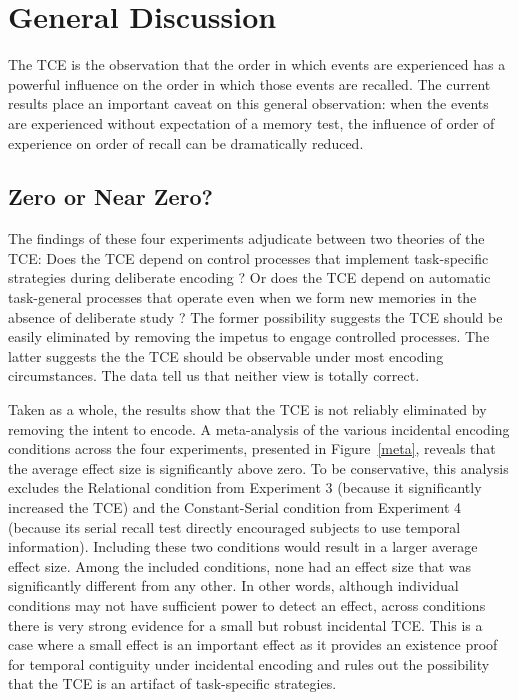 \documentclass[man,natbib,floatsintext]{apa6} %
\begin{document}
\section{General Discussion}
\color{red}
The TCE is the observation that the order in which events are experienced has a powerful influence on the order in which those events are recalled. The current results place an important caveat on this general observation: when the events are experienced without expectation of a memory test, the influence of order of experience on order of recall can be dramatically reduced.  

\label{zerovsnear}
\subsection{Zero or Near Zero?}
The findings of these four experiments adjudicate between two theories of the TCE: Does the TCE depend on control processes that implement task-specific strategies during deliberate encoding \citep{Hint16}? Or does the TCE depend on automatic task-general processes that operate even when we form new memories in the absence of deliberate study \citep{HealKaha17}? The former possibility suggests the TCE should be easily eliminated by removing the impetus to engage controlled processes. The latter suggests the the TCE should be observable under most encoding circumstances. The data tell us that neither view is totally correct.

Taken as a whole, the results show that the TCE is not reliably eliminated by removing the intent to encode. A meta-analysis of the various incidental encoding conditions across the four experiments, presented in Figure~\ref{meta}, reveals that the average effect size is significantly above zero. To be conservative, this analysis excludes the Relational condition from Experiment 3 (because it significantly increased the TCE) and the Constant-Serial condition from Experiment 4 (because its serial recall test directly encouraged subjects to use temporal information). Including these two conditions would result in a larger average effect size. Among the included conditions, none had an effect size that was significantly different from any other. In other words, although individual conditions may not have sufficient power to detect an effect, across conditions there is very strong evidence for a small but robust incidental TCE. This is a case where a small effect is an important effect as it provides an existence proof for temporal contiguity under incidental encoding and rules out the possibility that the TCE is an artifact of task-specific strategies.
\end{document}
